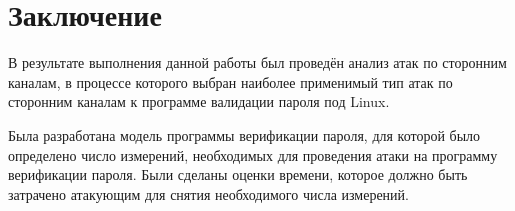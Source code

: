 \section{Заключение} \label{sec:summary}

В результате выполнения данной работы был проведён анализ атак по сторонним каналам, в процессе
которого выбран наиболее применимый тип атак
по сторонним каналам к программе валидации пароля под Linux.

Была разработана модель программы верификации пароля, для которой
было определено число измерений, необходимых для проведения атаки
на программу верификации пароля. Были сделаны оценки времени,
которое должно быть затрачено атакующим для снятия необходимого
числа измерений.

\clearpage
